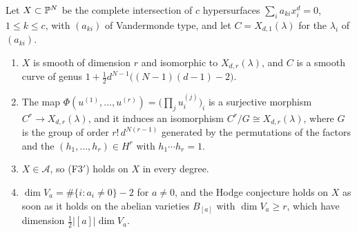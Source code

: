 \begin{theorem}\label{thm:vandermonde}
Let $X\subset\mathbb{P}^{N}$ be the complete intersection of $c$ hypersurfaces
$\sum_{i}a_{ki}x_{i}^{d}=0$, $1\le k\le c$, with $(a_{ki})$ of Vandermonde
type, and let $C=X_{d,1}(\lambda)$ for the $\lambda_{i}$ of $(a_{ki})$.
\begin{enumerate}[label=\textup{(\roman*)},leftmargin=2.6em,itemsep=2pt]
\item $X$ is smooth of dimension $r$ and isomorphic to $X_{d,r}(\lambda)$,
  and $C$ is a smooth curve of genus
  $1+\tfrac12d^{N-1}\bigl((N-1)(d-1)-2\bigr)$.
\item The map
  $\Phi(u^{(1)},\dots,u^{(r)})=\bigl(\prod_{j}u^{(j)}_{i}\bigr)_{i}$ is a
  surjective morphism $C^{r}\to X_{d,r}(\lambda)$, and it induces an
  isomorphism $C^{r}/G\cong X_{d,r}(\lambda)$, where $G$ is the group of
  order $r!\,d^{N(r-1)}$ generated by the permutations of the factors and the
  $(h_{1},\dots,h_{r})\in H^{r}$ with $h_{1}\cdots h_{r}=1$.
\item $X\in\mathcal{A}$, so \textup{(F3$'$)} holds on $X$ in every degree.
\item $\dim V_{a}=\#\{i:a_{i}\ne0\}-2$ for $a\ne0$, and the Hodge conjecture
  holds on $X$ as soon as it holds on the abelian varieties $B_{[a]}$ with
  $\dim V_{a}\ge r$, which have dimension $\tfrac12|[a]|\dim V_{a}$.
\end{enumerate}
\end{theorem}

